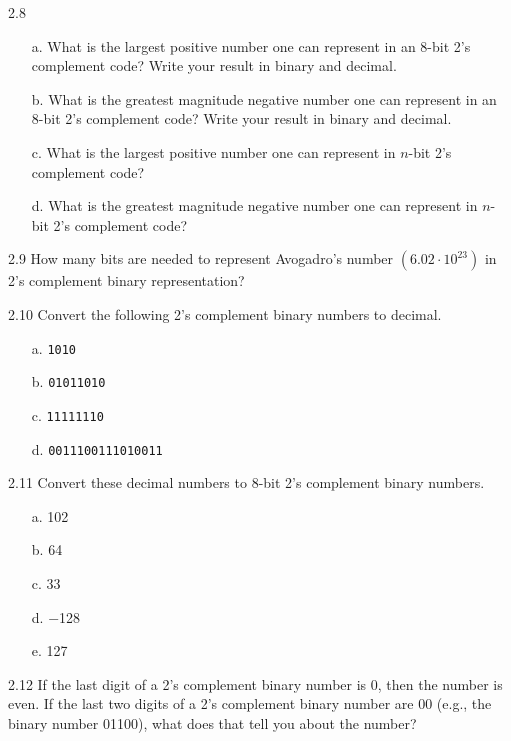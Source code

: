 \documentclass{patt}
\begin{document}
\begin{exercises}
\item[2.8]
\begin{enumerate}
\item[a.] What is the largest positive number one can represent in an 8-bit
2's complement code? Write your result in binary and decimal.

\item[b.] What is the greatest magnitude negative number one can represent
in an 8-bit 2's complement code? Write your result in binary
and decimal.

\item[c.] What is the largest positive number one can
represent in $n$-bit 2's complement code?

\item[d.] What is the greatest magnitude negative
number one can represent in $n$-bit 2's complement code?
\end{enumerate}

\item[2.9] How many bits are needed to represent Avogadro's
number $(6.02\cdot 10^{23})$ in 2's complement binary representation?

\item[2.10] Convert the following 2's complement binary numbers to decimal.
\begin{enumerate}[a.]
\item[a.] {\tt 1010}
\item[b.] {\tt 01011010}
\item[c.] {\tt 11111110}
\item[d.] {\tt 0011100111010011}
\end{enumerate}

\item[2.11] Convert these decimal numbers to 8-bit 2's
complement binary numbers.

\begin{enumerate}[d.]
\item[a.] 102
\item[b.] 64
\item[c.] 33
\item[d.] $-$128
\item[e.] 127
\end{enumerate}

\newpage

\item[2.12] If the last digit of a 2's complement binary number is 0, then
the number is even. If the last two digits of a 2's complement
binary number are 00 (e.g., the binary number 01100), what
does that tell you about the number?


\end{exercises}
\end{document}
